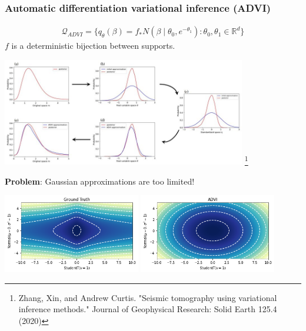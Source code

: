 \documentclass{beamer}
\newcommand{\RR}{\mathbb{R}}
\newcommand{\cQ}{\mathcal{Q}}
\begin{document}
\begin{frame}[allowframebreaks]
    \frametitle{Automatic differentiation variational inference (ADVI)}

    \begin{definition}
        \begin{align*}
            \cQ_{ADVI} = \{ q_\theta(\beta) =
            f_\ast N(\beta \mid \theta_{0}, e^{-\theta_{1}}) :
            \theta_0, \theta_1 \in \RR^d
            \}
        \end{align*}
        $f$ is a deterministic bijection between supports.
    \end{definition}

    \begin{center}
        \includegraphics[width=0.8\textwidth]{Figures/advi.png}
        \footnote{Zhang, Xin, and Andrew Curtis. "Seismic tomography using variational inference methods." Journal of Geophysical Research: Solid Earth 125.4 (2020)}
    \end{center}

    \framebreak

    \textbf{Problem}: Gaussian approximations are too limited!

    \begin{center}
        \includegraphics[width=0.45\textwidth]{../Figures/pancake-truth.png}
        \includegraphics[width=0.45\textwidth]{../Figures/pancake-advi.png}
    \end{center}
\end{frame}
\end{document}
